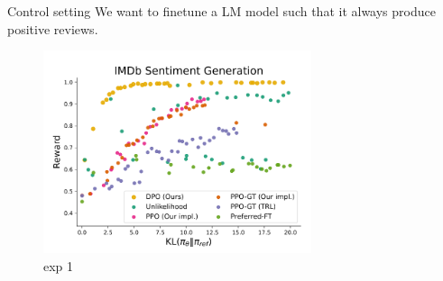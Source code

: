\documentclass[10pt,xcolor={usenames,dvipsnames,table},aspectratio=169]{beamer}
\begin{document}

\begin{frame}{Control setting}
    We want to finetune a LM model such that it always produce positive reviews.
    \begin{figure}
    \includegraphics[width=0.7\textwidth]{images/sentiment_result.png}
    \caption{exp 1}
    \end{figure}
\end{frame}
\end{document}
